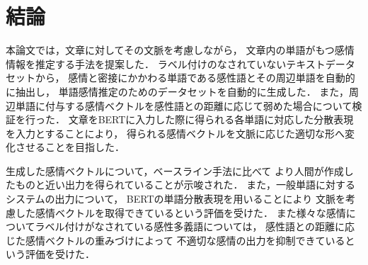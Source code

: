 \chapter{結論}
本論文では，文章に対してその文脈を考慮しながら，
文章内の単語がもつ感情情報を推定する手法を提案した．
ラベル付けのなされていないテキストデータセットから，
感情と密接にかかわる単語である感性語とその周辺単語を自動的に抽出し，
単語感情推定のためのデータセットを自動的に生成した．
また，周辺単語に付与する感情ベクトルを感性語との距離に応じて弱めた場合について検証を行った．
文章をBERTに入力した際に得られる各単語に対応した分散表現を入力とすることにより，
得られる感情ベクトルを文脈に応じた適切な形へ変化させることを目指した．

生成した感情ベクトルについて，ベースライン手法に比べて
より人間が作成したものと近い出力を得られていることが示唆された．
また，一般単語に対するシステムの出力について，
BERTの単語分散表現を用いることにより
文脈を考慮した感情ベクトルを取得できているという評価を受けた．
また様々な感情についてラベル付けがなされている感性多義語については，
感性語との距離に応じた感情ベクトルの重みづけによって
不適切な感情の出力を抑制できているという評価を受けた．
